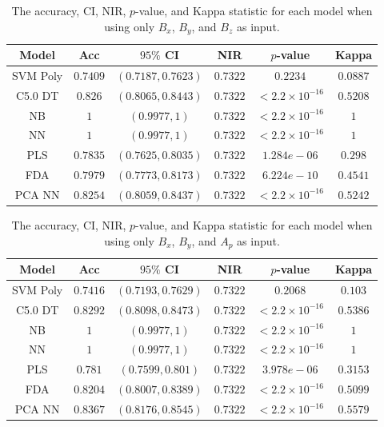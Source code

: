 \documentclass[sn-mathphys-num]{sn-jnl}%
\begin{document}
\begin{table}[!ht]
    \centering
    \caption{The accuracy, CI, NIR, $p$-value, and Kappa statistic for each model when using only $B_{x}$, $B_{y}$, and $B_{z}$ as input.}
	\label{tab:stats:reverse:coord}
	\begin{tabular}{|c|c|c|c|c|c|}
		\hline
		Model & Acc & $95\%$ CI & NIR & $p$-value & Kappa \\ \hline
		SVM Poly & $0.7409$ & $(0.7187, 0.7623)$ & $0.7322$ & $0.2234$ & $0.0887$ \\ \hline
		C5.0 DT & $0.826$ & $(0.8065, 0.8443)$ & $0.7322$ & $< 2.2 \times {10}^{-16}$ & $0.5208$ \\ \hline
		NB & $1$ & $(0.9977, 1)$ & $0.7322$ & $< 2.2 \times {10}^{-16}$ & $1$ \\ \hline
		NN & $1$ & $(0.9977, 1)$ & $0.7322$ & $< 2.2 \times {10}^{-16}$ & $1$ \\ \hline
		PLS & $0.7835$ & $(0.7625, 0.8035)$ & $0.7322$ & $1.284e-06$ & $0.298$ \\ \hline
		FDA & $0.7979$ & $(0.7773, 0.8173)$ & $0.7322$ & $6.224e-10$ & $0.4541$ \\ \hline
		PCA NN & $0.8254$ & $(0.8059, 0.8437)$ & $0.7322$ & $< 2.2 \times {10}^{-16}$ & $0.5242$ \\ \hline
	\end{tabular}
\end{table}

\begin{table}[!ht]
    \centering
    \caption{The accuracy, CI, NIR, $p$-value, and Kappa statistic for each model when using only $B_{x}$, $B_{y}$, and $A_{p}$ as input.}
	\label{tab:stats:reverse:xyap}
	\begin{tabular}{|c|c|c|c|c|c|}
		\hline
		Model & Acc & $95\%$ CI & NIR & $p$-value & Kappa \\ \hline
		SVM Poly & $0.7416$ & $(0.7193, 0.7629)$ & $0.7322$ & $0.2068$ & $0.103$ \\ \hline
		C5.0 DT & $0.8292$ & $(0.8098, 0.8473)$ & $0.7322$ & $< 2.2 \times {10}^{-16}$ & $0.5386$ \\ \hline
		NB & $1$ & $(0.9977, 1)$ & $0.7322$ & $< 2.2 \times {10}^{-16}$ & $1$ \\ \hline
		NN & $1$ & $(0.9977, 1)$ & $0.7322$ & $< 2.2 \times {10}^{-16}$ & $1$ \\ \hline
		PLS & $0.781$ & $(0.7599, 0.801)$ & $0.7322$ & $3.978e-06$ & $0.3153$ \\ \hline
		FDA & $0.8204$ & $(0.8007, 0.8389)$ & $0.7322$ & $< 2.2 \times {10}^{-16}$ & $0.5099$ \\ \hline
		PCA NN & $0.8367$ & $(0.8176, 0.8545)$ & $0.7322$ & $< 2.2 \times {10}^{-16}$ & $0.5579$ \\ \hline
	\end{tabular}
\end{table}
\end{document}
